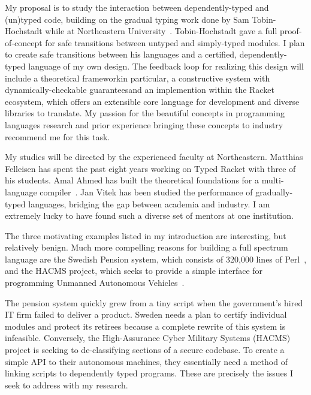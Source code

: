 \documentclass[12pt]{article}
\newcommand{\hdr}[2]{\vspace{-0.4cm}{\flushleft{\hrulefill\\\textbf{#1}\hfill{#2}\\\vspace{-0.2cm}\hrulefill}}\vspace{0.1cm}}
\begin{document}
My proposal is to study the interaction between dependently-typed and (un)typed code, building on the gradual typing work done by Sam Tobin-Hochstadt while at Northeastern University~\cite{tobin2010typed}.
Tobin-Hochstadt gave a full proof-of-concept for safe transitions between untyped and simply-typed modules.
I plan to create safe transitions between his languages and a certified, dependently-typed language of my own design.
The feedback loop for realizing this design will include a theoretical framework\textemdash in particular, a constructive system with dynamically-checkable guarantees\textemdash and an implemention within the Racket ecosystem, which offers an extensible core language for development and diverse libraries to translate.
My passion for the beautiful concepts in programming languages research and prior experience bringing these concepts to industry recommend me for this task.

My studies will be directed by the experienced faculty at Northeastern.
Matthias Felleisen has spent the past eight years working on Typed Racket with three of his students.
Amal Ahmed has built the theoretical foundations for a multi-language compiler~\cite{perconti2014verifying}.
Jan Vitek has been studied the performance of gradually-typed languages, bridging the gap between academia and industry.
I am extremely lucky to have found such a diverse set of mentors at one institution.

\newpage

\hdr{Broader Impacts}{}

The three motivating examples listed in my introduction are interesting, but relatively benign.
Much more compelling reasons for building a full spectrum language are the Swedish Pension system, which consists of 320,000 lines of Perl~\cite{jantalk}, and the HACMS project, which seeks to provide a simple interface for programming Unmanned Autonomous Vehicles~\cite{hacms}.

The pension system quickly grew from a tiny script when the government's hired IT firm failed to deliver a product.
Sweden needs a plan to certify individual modules and protect its retirees because a complete rewrite of this system is infeasible.
Conversely, the High-Assurance Cyber Military Systems (HACMS) project is seeking to de-classifying sections of a secure codebase.
To create a simple API to their autonomous machines, they essentially need a method of linking scripts to dependently typed programs.
These are precisely the issues I seek to address with my research.
\end{document}
